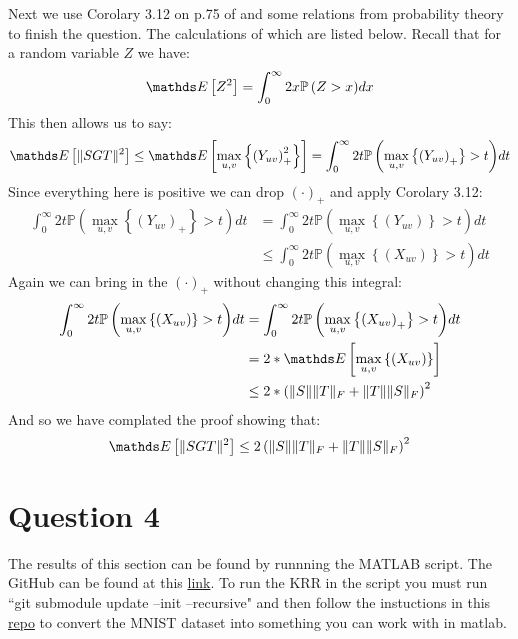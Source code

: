 Next we use Corolary 3.12 on p.75 of \cite{Ledoux2011Probability} and some relations from probability theory to finish the question. The calculations of which
are listed below. Recall that for a random variable $Z$ we have:
\begin{equation*}
    \pexp{Z^2} = \int_{0}^{\infty}{2x\mathbb{P}\left(Z > x \right)} dx
\end{equation*}
This then allows us to say:
\begin{align*}
    \pexp{\norm{SGT}^2} \leq \pexp{\underset{u,v}{\max}\left\{ \left(Y_{uv}\right)_{+}^2 \right \}} = \int_{0}^{\infty}{2t\mathbb{P}\left(\underset{u,v}{\max}\left\{ \left(Y_{uv}\right)_{+} \right\} > t \right)} dt 
\end{align*}
Since everything here is positive we can drop $(\cdot)_{+}$ and apply Corolary 3.12:
\begin{align*}
    \int_{0}^{\infty}{2t\mathbb{P}\left(\underset{u,v}{\max}\left\{ \left(Y_{uv}\right)_{+} \right\} > t \right)} dt  &= \int_{0}^{\infty}{2t\mathbb{P}\left(\underset{u,v}{\max}\left\{ \left(Y_{uv}\right) \right\} > t \right)} dt \\
                                                                                                                    &\leq \int_{0}^{\infty}{2t\mathbb{P}\left(\underset{u,v}{\max}\left\{ \left(X_{uv}\right) \right\} > t \right)} dt 
\end{align*}
Again we can bring in the $(\cdot)_{+}$ without changing this integral:
\begin{align*}
    \int_{0}^{\infty}{2t\mathbb{P}\left(\underset{u,v}{\max}\left\{ \left(X_{uv}\right) \right\} > t \right)} dt &= \int_{0}^{\infty}{2t\mathbb{P}\left(\underset{u,v}{\max}\left\{ \left(X_{uv}\right)_{+} \right\} > t \right)} dt \\
                                                                                                               &= 2*\pexp{\underset{u,v}{\max}\left\{(X_{uv})\right\}} \\
                                                                                                               &\leq  2*\left( \norm{S}\norm{T}_F +\norm{T}\norm{S}_F\right)^2
\end{align*}
And so we have complated the proof showing that:
\begin{equation*}
    \pexp{\norm{SGT}^2} \leq 2\left( \norm{S}\norm{T}_F +\norm{T}\norm{S}_F\right)^2
\end{equation*}

\section{Question 4}
The results of this section can be found by runnning the MATLAB script. The GitHub can be found at this
\href{https://github.com/AaronDinesh/MATH-403/tree/master/final_project}{link}. To run the KRR in the script you must run
``git submodule update --init --recursive" and then follow the instuctions in this
\href{https://github.com/sunsided/mnist-matlab/tree/9fd29f6c632d3f715ac484ab30ccfa4bcd04dbef}{repo} to convert the MNIST
dataset into something you can work with in matlab.